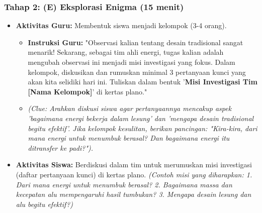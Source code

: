 \documentclass[a4paper,12pt]{article}
\begin{document}
\subsubsection{Tahap 2: (E) Eksplorasi Enigma (15 menit)}
\begin{itemize}
\item \textbf{Aktivitas Guru:} Membentuk siswa menjadi kelompok (3-4 orang).
    \begin{itemize}
    \item \textbf{Instruksi Guru:} "Observasi kalian tentang desain tradisional sangat menarik! Sekarang, sebagai tim ahli energi, tugas kalian adalah mengubah observasi ini menjadi misi investigasi yang fokus. Dalam kelompok, diskusikan dan rumuskan minimal 3 pertanyaan kunci yang akan kita selidiki hari ini. Tuliskan dalam bentuk '\textbf{Misi Investigasi Tim [Nama Kelompok]}' di kertas plano."
    \item \textit{(Clue: Arahkan diskusi siswa agar pertanyaannya mencakup aspek 'bagaimana energi bekerja dalam lesung' dan 'mengapa desain tradisional begitu efektif'. Jika kelompok kesulitan, berikan pancingan: "Kira-kira, dari mana energi untuk menumbuk berasal? Dan bagaimana energi itu ditransfer ke padi?").}
    \end{itemize}
\item \textbf{Aktivitas Siswa:} Berdiskusi dalam tim untuk merumuskan misi investigasi (daftar pertanyaan kunci) di kertas plano. \textit{(Contoh misi yang diharapkan: 1. Dari mana energi untuk menumbuk berasal? 2. Bagaimana massa dan kecepatan alu mempengaruhi hasil tumbukan? 3. Mengapa desain lesung dan alu begitu efektif?)}
\end{itemize}
\end{document}
